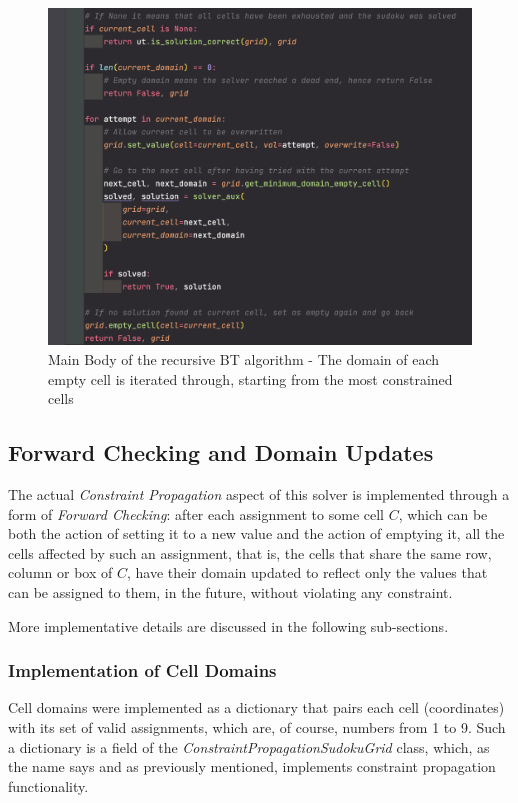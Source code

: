 \begin{figure}[h]
    \centering
    \includegraphics[scale=0.65]{assignment-1/images/cp/main.png}
    \caption{Main Body of the recursive BT algorithm - The domain of each empty cell is iterated through, starting from the most constrained cells}
    \label{fig:main_1}
\end{figure}

\subsection{Forward Checking and Domain Updates}

The actual \textit{Constraint Propagation} aspect of this solver is implemented through a form of \textit{Forward Checking}: after each assignment to some cell $C$, which can be both the action of setting it to a new value and the action of emptying it, all the cells affected by such an assignment, that is, the cells that share the same row, column or box of $C$, have their domain updated to reflect only the values that can be assigned to them, in the future, without violating any constraint.
\par
More implementative details are discussed in the following sub-sections.

\subsubsection{Implementation of Cell Domains}

Cell domains were implemented as a dictionary that pairs each cell (coordinates) with its set of valid assignments, which are, of course, numbers from 1 to 9. Such a dictionary is a field of the \textit{ConstraintPropagationSudokuGrid} class, which, as the name says and as previously mentioned, implements constraint propagation functionality.

